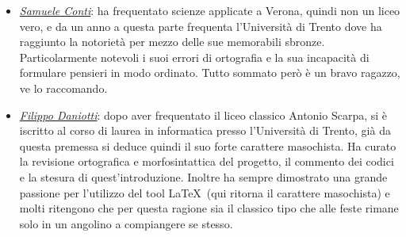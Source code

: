 \documentclass[class=book, crop=false, oneside]{standalone}
\begin{document}
\begin{minipage}{.3\textwidth}
	{%
		\setlength{\fboxsep}{0pt}%
		\setlength{\fboxrule}{1pt}%
	}%
\end{minipage}
\hspace{.01\textwidth}
\begin{minipage}{.7\textwidth}
    \begin{itemize}
		\item \emph{\href{https://github.com/Samaretas}{Samuele Conti}}: ha frequentato scienze applicate a Verona, quindi non un liceo vero, e da un anno a questa parte frequenta l'Università di Trento dove ha raggiunto la notorietà per mezzo delle sue memorabili sbronze. Particolarmente notevoli i suoi errori di ortografia e la sua incapacità di formulare pensieri in modo ordinato. Tutto sommato però è un bravo ragazzo, ve lo raccomando.
	\end{itemize}
\end{minipage}
\vskip 20pt
\begin{minipage}{.6\textwidth}
    \begin{itemize}
		\item \emph{\href{https://github.com/filippodaniotti}{Filippo Daniotti}}: dopo aver frequentato il liceo classico Antonio Scarpa, si è iscritto al corso di laurea in informatica presso l'Università di Trento, già da questa premessa si deduce quindi il suo forte carattere masochista. Ha curato la revisione ortografica e morfosintattica del progetto, il commento dei codici e la stesura di quest'introduzione. Inoltre ha sempre dimostrato una grande passione per l'utilizzo del tool \LaTeX\ (qui ritorna il carattere masochista) e molti ritengono che per questa ragione sia il classico tipo che alle feste rimane solo in un angolino a compiangere se stesso.
	\end{itemize}
\end{minipage}
\end{document}
